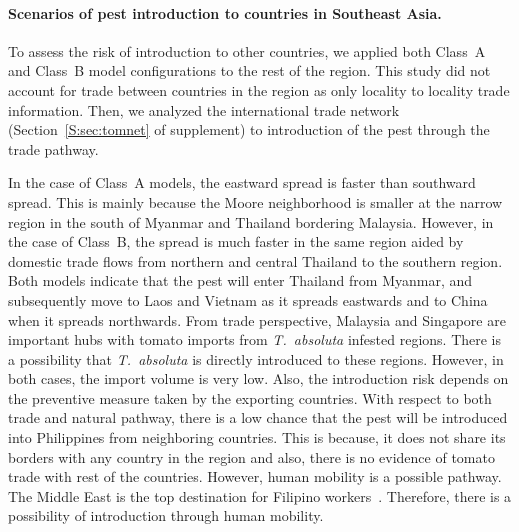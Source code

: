 \documentclass[11pt]{article}
\newcommand{\tuta}{\emph{T.~absoluta}}
\theoremstyle{definition}
\begin{document}
\paragraph{Scenarios of pest introduction to countries in Southeast Asia.}
To assess the risk of introduction to other countries, we applied both
Class~A and Class~B model configurations to the rest of the region. This
study did not account for trade between countries in the region as only
locality to locality trade information. Then, we analyzed the international
trade network (Section~\ref{S:sec:tomnet} of supplement) to introduction of
the pest through the trade pathway.

In the case of Class~A models, the eastward spread is faster than southward
spread. This is mainly because the Moore neighborhood is smaller at the
narrow region in the south of Myanmar and Thailand bordering Malaysia.
However, in the case of Class~B, the spread is much faster in the same
region aided by domestic trade flows from northern and central Thailand to
the southern region. Both models indicate that the pest will enter Thailand
from Myanmar, and subsequently move to Laos and Vietnam as it spreads
eastwards and to China when it spreads northwards.
From trade perspective, 
Malaysia and Singapore are important hubs with tomato imports from \tuta{}
infested regions. There is a possibility that \tuta{} is directly
introduced to these regions.  However, in both cases, the import volume is
very low. Also, the introduction risk depends on the preventive measure
taken by the exporting countries. With respect to both trade and natural
pathway, there is a low chance that the pest will be introduced into
Philippines from neighboring countries.  This is because, it does not share
its borders with any country in the region and also, there is no evidence
of tomato trade with rest of the countries. However, human mobility is a
possible pathway. The Middle East is the top destination for Filipino
workers~\cite{rodriguez2011philippine}.  Therefore, there is a possibility
of introduction through human mobility.
\end{document}
